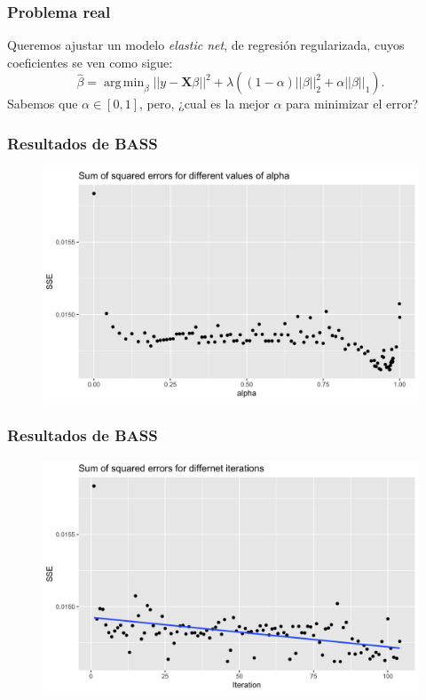 \documentclass[fleqn]{beamer}
\DeclareMathOperator*{\argmin}{arg\,min}
\begin{document}
\begin{frame}
  \frametitle{Problema real}
  Queremos ajustar un modelo \textit{elastic net}, de regresión regularizada, cuyos coeficientes se ven como sigue: 
  $$\hat \beta = \argmin_{\beta} ||y - \boldsymbol{X} \beta||^2 + \lambda \left( (1 - \alpha) ||\beta||_2^2 + \alpha||\beta||_1 \right).$$
  Sabemos que $\alpha \in [0,1]$, pero, ¿cual es la mejor $\alpha$ para minimizar el error?
\end{frame}

\begin{frame}
  \frametitle{Resultados de BASS}
  \begin{figure}[h]
    \centering
    \includegraphics[width=1\textwidth]{Figures/sse_alpha.png}
    \label{fig:alfa}
  \end{figure}
\end{frame}

\begin{frame}
  \frametitle{Resultados de BASS}
  \begin{figure}[h]
    \centering
    \includegraphics[width=1\textwidth]{Figures/sse_iter.png}
    \label{fig:iter}
  \end{figure}
\end{frame}
\end{document}
